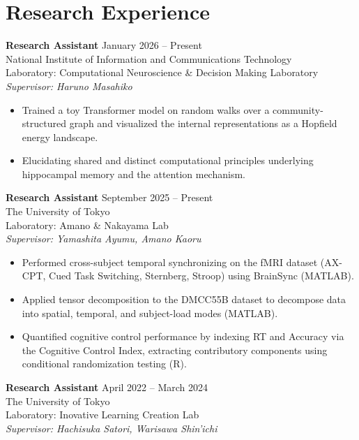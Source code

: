 \documentclass[letterpaper,10.5pt]{article}
\begin{document}
\section*{Research Experience}
\textbf{Research Assistant} \hfill January 2026 -- Present \\ 
National Institute of Information and Communications Technology \\ 
{\small {Laboratory: Computational Neuroscience \& Decision Making Laboratory}} \\ 
{\small \textit{Supervisor: Haruno Masahiko}} \\ 
\begin{itemize}
  \item Trained a toy Transformer model on random walks over a community-structured graph and visualized the internal representations as a Hopfield energy landscape.
  \item Elucidating shared and distinct computational principles underlying hippocampal memory and the attention mechanism.
\end{itemize}
\vspace{8pt}
\textbf{Research Assistant} \hfill September 2025 -- Present \\ 
The University of Tokyo \\ 
{\small {Laboratory: Amano \& Nakayama Lab}} \\ 
{\small \textit{Supervisor: Yamashita Ayumu, Amano Kaoru}} \\ 
\begin{itemize}
  \item Performed cross-subject temporal synchronizing on the fMRI dataset (AX-CPT, Cued Task Switching, Sternberg, Stroop) using BrainSync (MATLAB).
  \item Applied tensor decomposition to the DMCC55B dataset to decompose data into spatial, temporal, and subject-load modes (MATLAB).
  \item Quantified cognitive control performance by indexing RT and Accuracy via the Cognitive Control Index, extracting contributory components using conditional randomization testing (R).
\end{itemize}
\vspace{8pt}
\textbf{Research Assistant} \hfill April 2022 -- March 2024 \\ 
The University of Tokyo \\ 
{\small {Laboratory: Inovative Learning Creation Lab}} \\ 
{\small \textit{Supervisor: Hachisuka Satori, Warisawa Shin'ichi}} \\ 
\end{document}
